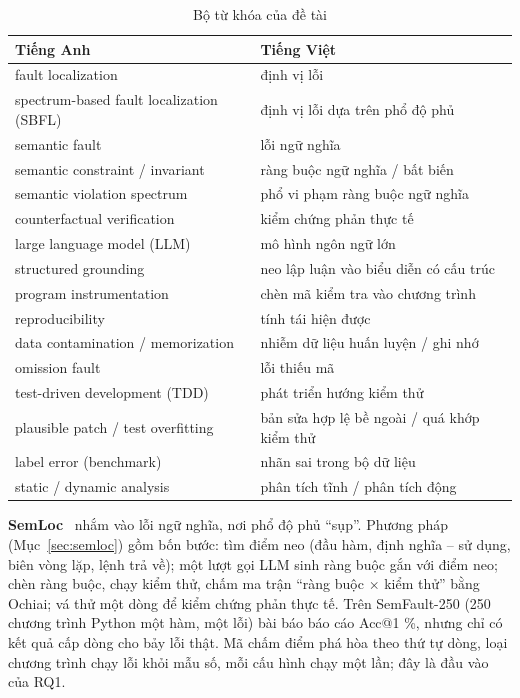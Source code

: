 \begin{table}[H]
\centering
\caption{Bộ từ khóa của đề tài}
\label{tab:tu-khoa}
\small
\begin{tabular}{@{}ll@{}}
\toprule
Tiếng Anh & Tiếng Việt \\
\midrule
fault localization & định vị lỗi \\
spectrum-based fault localization (SBFL) & định vị lỗi dựa trên phổ độ phủ \\
semantic fault & lỗi ngữ nghĩa \\
semantic constraint / invariant & ràng buộc ngữ nghĩa / bất biến \\
semantic violation spectrum & phổ vi phạm ràng buộc ngữ nghĩa \\
counterfactual verification & kiểm chứng phản thực tế \\
large language model (LLM) & mô hình ngôn ngữ lớn \\
structured grounding & neo lập luận vào biểu diễn có cấu trúc \\
program instrumentation & chèn mã kiểm tra vào chương trình \\
reproducibility & tính tái hiện được \\
data contamination / memorization & nhiễm dữ liệu huấn luyện / ghi nhớ \\
omission fault & lỗi thiếu mã \\
test-driven development (TDD) & phát triển hướng kiểm thử \\
plausible patch / test overfitting & bản sửa hợp lệ bề ngoài / quá khớp kiểm thử \\
label error (benchmark) & nhãn sai trong bộ dữ liệu \\
static / dynamic analysis & phân tích tĩnh / phân tích động \\
\bottomrule
\end{tabular}
\end{table}

\label{sec:ba-bai-bao}%
\textbf{SemLoc}~\cite{yang2026semloc} nhắm vào lỗi ngữ nghĩa, nơi phổ độ phủ ``sụp''. Phương pháp (Mục~\ref{sec:semloc}) gồm bốn bước: tìm điểm
neo (đầu hàm, định nghĩa -- sử dụng, biên vòng lặp, lệnh trả về); một lượt gọi LLM sinh ràng buộc gắn với điểm neo; chèn
ràng buộc, chạy kiểm thử, chấm ma trận ``ràng buộc $\times$ kiểm thử'' bằng Ochiai; vá thử một dòng để kiểm chứng phản
thực tế. Trên SemFault-250 (250 chương trình Python một hàm, một lỗi) bài báo báo cáo Acc@1
\RqOneSemlocClaudeTZeroEightAuthorAllAccOne\%, nhưng chỉ có kết quả cấp dòng cho bảy lỗi thật. Mã chấm điểm phá hòa theo
thứ tự dòng, loại chương trình chạy lỗi khỏi mẫu số, mỗi cấu hình chạy một lần; đây là đầu vào của RQ1.

